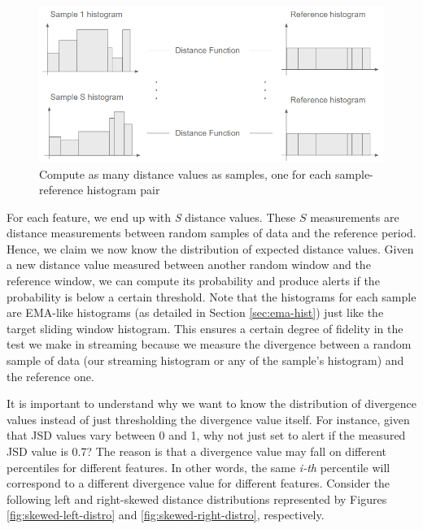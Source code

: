 \begin{figure}[!htb]
    \begin{center}
      \includegraphics[scale=0.7]{figures/compute-sample-distances.png}
      \caption[Compute as many distance values as samples]{Compute as many distance values as samples, one for each sample-reference histogram pair}
      \label{fig:compute-sample-distances}
    \end{center}
\end{figure}

For each feature, we end up with \textit{S} distance values. These $S$ measurements are distance measurements between random samples of data and the reference period. Hence, we claim we now know the distribution of expected distance values. Given a new distance value measured between another random window and the reference window, we can compute its probability and produce alerts if the probability is below a certain threshold. Note that the histograms for each sample are EMA-like histograms (as detailed in Section \ref{sec:ema-hist}) just like the target sliding window histogram. This ensures a certain degree of fidelity in the test we make in streaming because we measure the divergence between a random sample of data (our streaming histogram or any of the sample's histogram) and the reference one.


It is important to understand why we want to know the distribution of divergence values instead of just thresholding the divergence value itself. For instance, given that JSD values vary between 0 and 1, why not just set to alert if the measured JSD value is 0.7? The reason is that a divergence value may fall on different percentiles for different features. In other words, the same \textit{i-th} percentile will correspond to a different divergence value for different features. Consider the following left and right-skewed distance distributions represented by Figures \ref{fig:skewed-left-distro} and \ref{fig:skewed-right-distro}, respectively. 

